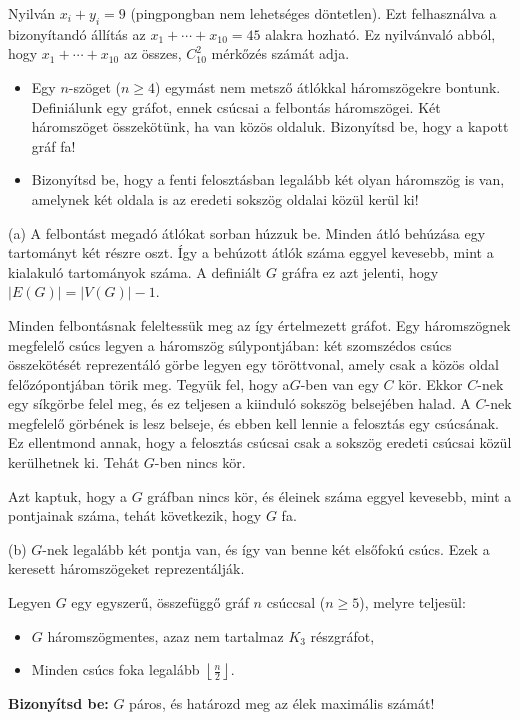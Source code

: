 \begin{solution}
	Nyilván $x_{i}+y_{i}=9$ (pingpongban nem lehetséges döntetlen). Ezt
	felhasználva a bizonyítandó állítás az $x_{1}+\cdots+x_{10}=45$ alakra
	hozható. Ez nyilvánvaló abból, hogy $x_{1}+\cdots+x_{10}$ az összes,
	$C_{10}^{2}$ mérkőzés számát adja. 
	\begin{itemize}
		\item[(a)] Egy $n$-szöget ($n\geq4$) egymást nem metsző átlókkal háromszögekre
		bontunk. Definiálunk egy gráfot, ennek csúcsai a felbontás háromszögei.
		Két háromszöget összekötünk, ha van közös oldaluk. Bizonyítsd be,
		hogy a kapott gráf fa! 
		\item[(b)] Bizonyítsd be, hogy a fenti felosztásban legalább két olyan háromszög
		is van, amelynek két oldala is az eredeti sokszög oldalai közül kerül
		ki! 
	\end{itemize}
	(a) A felbontást megadó átlókat sorban húzzuk be. Minden átló behúzása
	egy tartományt két részre oszt. Így a behúzott átlók száma eggyel
	kevesebb, mint a kialakuló tartományok száma. A definiált $G$ gráfra
	ez azt jelenti, hogy $|E(G)|=|V(G)|-1$.
	
	Minden felbontásnak feleltessük meg az így értelmezett gráfot. Egy
	háromszögnek megfelelő csúcs legyen a háromszög súlypontjában: két
	szomszédos csúcs összekötését reprezentáló görbe legyen egy töröttvonal,
	amely csak a közös oldal felőzópontjában törik meg. Tegyük fel, hogy
	a$G$-ben van egy $C$ kör. Ekkor $C$-nek egy síkgörbe felel meg,
	és ez teljesen a kiinduló sokszög belsejében halad. A $C$-nek megfelelő
	görbének is lesz belseje, és ebben kell lennie a felosztás egy csúcsának.
	Ez ellentmond annak, hogy a felosztás csúcsai csak a sokszög eredeti
	csúcsai közül kerülhetnek ki. Tehát $G$-ben nincs kör.
	
	Azt kaptuk, hogy a $G$ gráfban nincs kör, és éleinek száma eggyel
	kevesebb, mint a pontjainak száma, tehát következik, hogy $G$ fa.
	
	(b) $G$-nek legalább két pontja van, és így van benne két elsőfokú
	csúcs. Ezek a keresett háromszögeket reprezentálják. 
\end{solution}
\begin{extraproblem}
	Legyen $G$ egy egyszerű, összefüggő gráf $n$ csúccsal ($n\geq5$),
	melyre teljesül: 
	\begin{itemize}
		\item $G$ háromszögmentes, azaz nem tartalmaz $K_{3}$ részgráfot, 
		\item Minden csúcs foka legalább $\left\lfloor \frac{n}{2}\right\rfloor $. 
	\end{itemize}
	\textbf{Bizonyítsd be:} $G$ páros, és határozd meg az élek maximális
	számát! 
\end{extraproblem}

